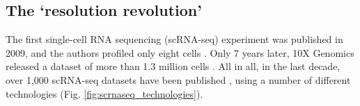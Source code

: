 



\newpage

\subsection{The `resolution revolution'}
\label{sec:scrnaseq}

The first single-cell RNA sequencing (scRNA-seq) experiment was published in 2009, and the authors profiled only eight cells \cite{tang2009mrna}. 
Only 7 years later, 10X Genomics released a dataset of more than 1.3 million cells \cite{102016our}.
All in all, in the last decade, over 1,000 scRNA-seq datasets have been published 
\cite{svensson2018exponential, svensson2019curated, svensson2020single},
using a number of different technologies 
\cite{islam2011characterization, hashimshony2012cel, ramskold2012full, picelli2013smart, sasagawa2013quartz, jaitin2014massively, macosko2015highly,klein2015droplet, gierahn2017seq, zheng2017massively, hagemann2020single}
(Fig. \ref{fig:scrnaseq_technologies}).

